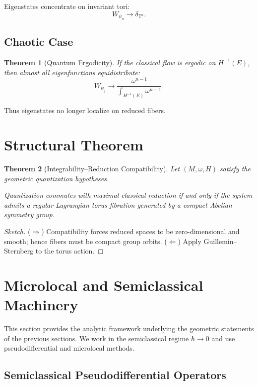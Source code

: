 \documentclass[11pt]{article}
\newtheorem{theorem}{Theorem}[section]
\begin{document}
Eigenstates concentrate on invariant tori:
\[
W_{\psi_n} \to \delta_{\mathbb{T}^n}.
\]

\subsection{Chaotic Case}

\begin{theorem}[Quantum Ergodicity]
If the classical flow is ergodic on $H^{-1}(E)$, then almost all eigenfunctions equidistribute:
\[
W_{\psi_j} \to \frac{\omega^{n-1}}{\int_{H^{-1}(E)} \omega^{n-1}}.
\]
\end{theorem}

Thus eigenstates no longer localize on reduced fibers.

\section{Structural Theorem}

\begin{theorem}[Integrability--Reduction Compatibility]
Let $(M,\omega,H)$ satisfy the geometric quantization hypotheses.

Quantization commutes with maximal classical reduction
if and only if the system admits a regular Lagrangian torus fibration generated by a compact Abelian symmetry group.
\end{theorem}

\begin{proof}[Sketch]
($\Rightarrow$) Compatibility forces reduced spaces to be zero-dimensional and smooth; hence fibers must be compact group orbits.  
($\Leftarrow$) Apply Guillemin--Sternberg to the torus action.
\end{proof}

\section{Microlocal and Semiclassical Machinery}
\label{sec:microlocal}

This section provides the analytic framework underlying the geometric
statements of the previous sections.  We work in the semiclassical
regime $\hbar \to 0$ and use pseudodifferential and microlocal methods.

\subsection{Semiclassical Pseudodifferential Operators}
\end{document}
